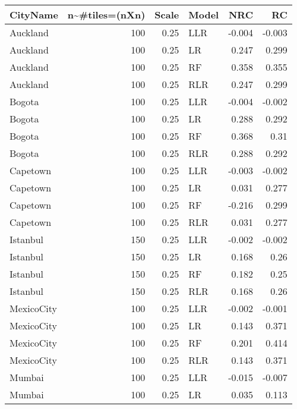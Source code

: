 \begin{tabular}{lrrlrr}
\toprule
 CityName    &   n\textasciitilde{}\#tiles=(nXn) &   Scale & Model   &    NRC &     RC \\
\midrule
 Auckland    &              100 &    0.25 & LLR     & -0.004 & -0.003 \\
 Auckland    &              100 &    0.25 & LR      &  0.247 &  0.299 \\
 Auckland    &              100 &    0.25 & RF      &  0.358 &  0.355 \\
 Auckland    &              100 &    0.25 & RLR     &  0.247 &  0.299 \\
 Bogota      &              100 &    0.25 & LLR     & -0.004 & -0.002 \\
 Bogota      &              100 &    0.25 & LR      &  0.288 &  0.292 \\
 Bogota      &              100 &    0.25 & RF      &  0.368 &  0.31  \\
 Bogota      &              100 &    0.25 & RLR     &  0.288 &  0.292 \\
 Capetown    &              100 &    0.25 & LLR     & -0.003 & -0.002 \\
 Capetown    &              100 &    0.25 & LR      &  0.031 &  0.277 \\
 Capetown    &              100 &    0.25 & RF      & -0.216 &  0.299 \\
 Capetown    &              100 &    0.25 & RLR     &  0.031 &  0.277 \\
 Istanbul    &              150 &    0.25 & LLR     & -0.002 & -0.002 \\
 Istanbul    &              150 &    0.25 & LR      &  0.168 &  0.26  \\
 Istanbul    &              150 &    0.25 & RF      &  0.182 &  0.25  \\
 Istanbul    &              150 &    0.25 & RLR     &  0.168 &  0.26  \\
 MexicoCity  &              100 &    0.25 & LLR     & -0.002 & -0.001 \\
 MexicoCity  &              100 &    0.25 & LR      &  0.143 &  0.371 \\
 MexicoCity  &              100 &    0.25 & RF      &  0.201 &  0.414 \\
 MexicoCity  &              100 &    0.25 & RLR     &  0.143 &  0.371 \\
 Mumbai      &              100 &    0.25 & LLR     & -0.015 & -0.007 \\
 Mumbai      &              100 &    0.25 & LR      &  0.035 &  0.113 \\

\end{tabular}
